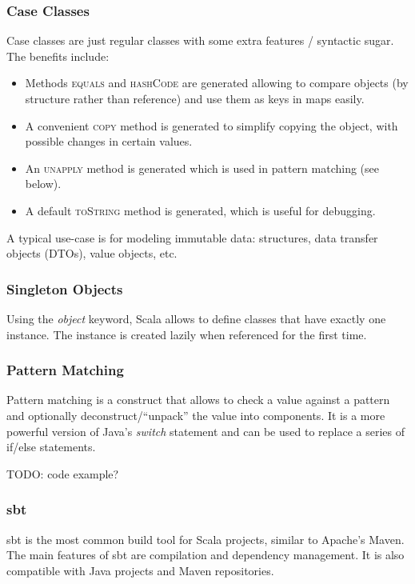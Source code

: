 \subsubsection{Case Classes}
Case classes are just regular classes with some extra features / syntactic sugar.
The benefits include:
\begin{itemize}
  \item Methods \textsc{equals} and \textsc{hashCode} are generated allowing to compare objects (by structure rather than reference) and use them as keys in maps easily.
  \item A convenient \textsc{copy} method is generated to simplify copying the object, with possible changes in certain values.
  \item An \textsc{unapply} method is generated which is used in pattern matching (see below).
  \item A default \textsc{toString} method is generated, which is useful for debugging.
\end{itemize}

A typical use-case is for modeling immutable data: structures, data transfer objects (DTOs), value objects, etc.


\subsubsection{Singleton Objects}
Using the \textit{object} keyword, Scala allows to define classes that have exactly one instance.
The instance is created lazily when referenced for the first time.

\subsubsection{Pattern Matching}
Pattern matching is a construct that allows to check a value against a pattern and optionally deconstruct/\enquote{unpack} the value into components.
It is a more powerful version of Java's \textit{switch} statement and can be used to replace a series of if/else statements.

TODO: code example?

\subsubsection{sbt}
sbt is the most common build tool for Scala projects, similar to Apache's Maven.
The main features of sbt are compilation and dependency management.
It is also compatible with Java projects and Maven repositories.

